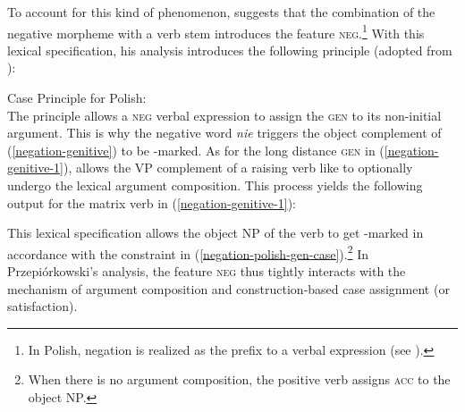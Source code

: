 \documentclass[output=paper
                ,modfonts
                ,nonflat
	        ,collection
	        ,collectionchapter
	        ,collectiontoclongg
 	        ,biblatex
                ,babelshorthands
                ,newtxmath
                ,draftmode
                ,colorlinks, citecolor=brown
]{./langsci/langscibook}
\begin{document}
{\begin{exe}
\begin{xlist}
\iffalse{
\eal
\ex \label{negation-genitive-1}
\gll Pisz\c{e} listy /*list\'{o}w.
     write.1\textsc{sg} letters.\textsc{acc}/letters.\textsc{gen}\\
\glt `I am writing letters.'

\ex
\gll Nie chcialem   pisa\'{c} list\'{o}w. \\
     not wanted.1\sg.\mas{} write.\textsc{inf} letters.\textsc{gen}\\
\glt `I didn't want to write letters.'
\zl}\fi
To account for this kind of phenomenon, \citet{Prz:00}
suggests that the combination of the
negative morpheme  with a verb stem introduces the
feature \textsc{neg}.\footnote{In Polish,  negation is realized as the prefix
   to a verbal expression (see \citealt{PK:99, Prz:00, Prz:01}).}
  With this lexical specification, his analysis introduces
 the following principle (adopted from \citealt[]{Prz:00}):

\ea
\label{negation-polish-gen-case}
Case Principle for Polish:\\
  \impl
{}
\z
The principle allows a \textsc{neg} verbal expression to assign
 the \textsc{gen} to its non-initial argument.
%
This is why the negative word \textit{nie} triggers
 the object complement of
(\ref{negation-genitive}) to be \GEN-marked.
As for the long distance \textsc{gen} in (\ref{negation-genitive-1}), \citet[]{Prz:00}
allows the VP complement of a raising verb like  to optionally undergo the lexical
argument composition. This process yields the following output for the
matrix verb in (\ref{negation-genitive-1}):

\ea
\label{negation-polish-case}
\z
%
This lexical specification allows the object NP of the verb to get
\GEN-marked in accordance with the constraint in (\ref{negation-polish-gen-case}).\footnote{When
there is no argument composition, the positive verb 
assigns \textsc{acc} to the object NP.} In Przepiórkowski's analysis, the feature
\textsc{neg} thus tightly interacts with the mechanism of argument composition and construction-based case assignment (or satisfaction).


\end{xlist}
\end{exe}}
\end{document}
